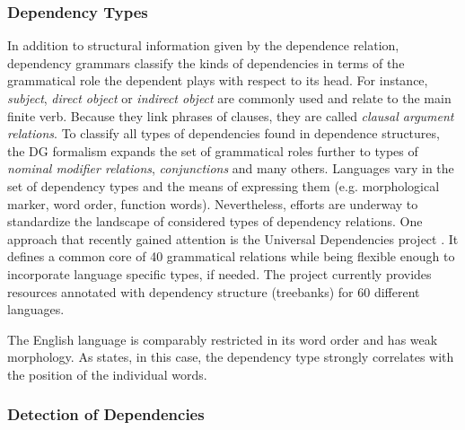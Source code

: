 \subsubsection{Dependency Types} \label{subsec:dependency_types}
In addition to structural information given by the dependence relation, dependency grammars classify the kinds of dependencies in terms of the grammatical role the dependent plays with respect to its head. For instance, \textit{subject}, \textit{direct object} or \textit{indirect object} are commonly used and relate to the main finite verb. Because they link phrases of clauses, they are called \textit{clausal argument relations}. To classify all types of dependencies found in dependence structures, the \ac{DG} formalism expands the set of grammatical roles further to types of \textit{nominal modifier relations}, \textit{conjunctions} and many others. Languages vary in the set of dependency types and the means of expressing them (e.g. morphological marker, word order, function words). Nevertheless, efforts are underway to standardize the landscape of considered types of dependency relations. One approach that recently gained attention is the Universal Dependencies project \autocite{nivre_universal_2016}. It defines a common core of 40 grammatical relations while being flexible enough to incorporate language specific types, if needed. The project currently provides resources annotated with dependency structure (treebanks) for 60 different languages.

The English language is comparably restricted in its word order and has weak morphology. As \textcite{jurafsky_dependency_2014} states, in this case, the dependency type strongly correlates with the position of the individual words.


\subsubsection{Detection of Dependencies}



